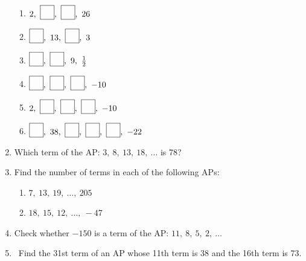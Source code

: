 \documentclass[12pt]{article}
\begin{document}
\begin{enumerate}
\begin{enumerate}[label=(\alph*)]
    \item \( 2,\ \fbox{\rule{0pt}{1em}\hspace{1em}},\ \fbox{\rule{0pt}{1em}\hspace{1em}},\ 26 \)
    \item \( \fbox{\rule{0pt}{1em}\hspace{1em}},\ 13,\ \fbox{\rule{0pt}{1em}\hspace{1em}},\ 3 \)
    \item \( \fbox{\rule{0pt}{1em}\hspace{1em}},\ \fbox{\rule{0pt}{1em}\hspace{1em}},\ 9,\ \frac{1}{2} \)
    \item \( \fbox{\rule{0pt}{1em}\hspace{1em}},\ \fbox{\rule{0pt}{1em}\hspace{1em}},\ \fbox{\rule{0pt}{1em}\hspace{1em}},\ -10 \)
    \item \( 2,\ \fbox{\rule{0pt}{1em}\hspace{1em}},\ \fbox{\rule{0pt}{1em}\hspace{1em}},\ \fbox{\rule{0pt}{1em}\hspace{1em}},\ -10 \)
    \item \( \fbox{\rule{0pt}{1em}\hspace{1em}},\ 38,\ \fbox{\rule{0pt}{1em}\hspace{1em}},\ \fbox{\rule{0pt}{1em}\hspace{1em}},\ \fbox{\rule{0pt}{1em}\hspace{1em}},\ -22 \)
\end{enumerate}


\item Which term of the AP: \( 3,\ 8,\ 13,\ 18,\ \ldots \) is 78?

\item Find the number of terms in each of the following APs:

\begin{enumerate}[label=(\alph*)]
    \item \( 7,\ 13,\ 19,\ \ldots,\ 205 \)
    \item \( 18,\ 15,\ 12,\ \ldots,\ -47 \)
\end{enumerate}


\item Check whether $-150$ is a term of the AP: $11,\ 8,\ 5,\ 2,\ \ldots$

\item\ Find the 31st term of an AP whose 11th term is 38 and the 16th term is 73.


\end{enumerate}
\end{document}

